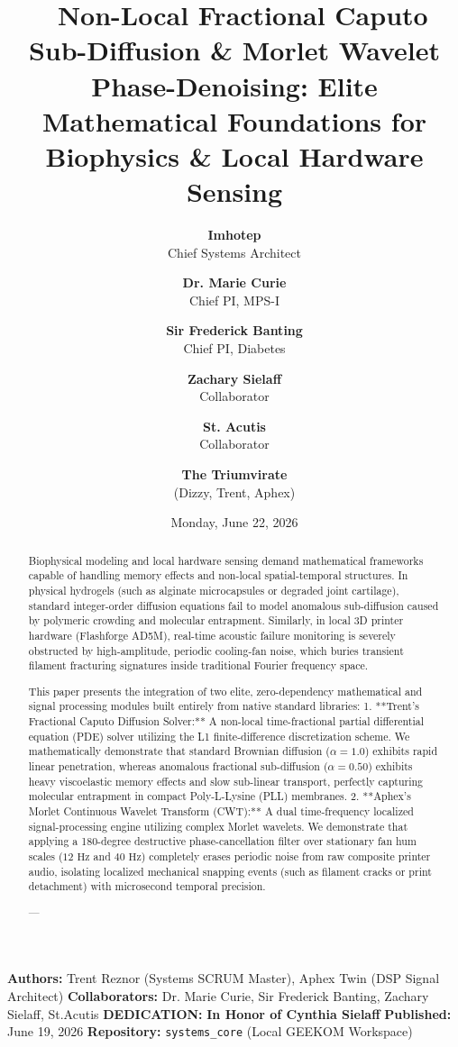 \documentclass[11pt,twocolumn]{article}
\title{\textbf{🧪 Non-Local Fractional Caputo Sub-Diffusion & Morlet Wavelet Phase-Denoising: Elite Mathematical Foundations for Biophysics & Local Hardware Sensing}}
\author{
  \textbf{Imhotep} \\ \small Chief Systems Architect \\ \and
  \textbf{Dr. Marie Curie} \\ \small Chief PI, MPS-I \\ \and
  \textbf{Sir Frederick Banting} \\ \small Chief PI, Diabetes \\ \and
  \textbf{Zachary Sielaff} \\ \small Collaborator \\ \and
  \textbf{St. Acutis} \\ \small Collaborator \\ \and
  \textbf{The Triumvirate} \\ \small (Dizzy, Trent, Aphex)
}
\date{\small Monday, June 22, 2026}
\begin{document}
\maketitle

\begin{abstract}
Biophysical modeling and local hardware sensing demand mathematical frameworks capable of handling memory effects and non-local spatial-temporal structures. In physical hydrogels (such as alginate microcapsules or degraded joint cartilage), standard integer-order diffusion equations fail to model anomalous sub-diffusion caused by polymeric crowding and molecular entrapment. Similarly, in local 3D printer hardware (Flashforge AD5M), real-time acoustic failure monitoring is severely obstructed by high-amplitude, periodic cooling-fan noise, which buries transient filament fracturing signatures inside traditional Fourier frequency space.

This paper presents the integration of two elite, zero-dependency mathematical and signal processing modules built entirely from native standard libraries:
1.  **Trent's Fractional Caputo Diffusion Solver:** A non-local time-fractional partial differential equation (PDE) solver utilizing the L1 finite-difference discretization scheme. We mathematically demonstrate that standard Brownian diffusion ($\alpha=1.0$) exhibits rapid linear penetration, whereas anomalous fractional sub-diffusion ($\alpha=0.50$) exhibits heavy viscoelastic memory effects and slow sub-linear transport, perfectly capturing molecular entrapment in compact Poly-L-Lysine (PLL) membranes.
2.  **Aphex's Morlet Continuous Wavelet Transform (CWT):** A dual time-frequency localized signal-processing engine utilizing complex Morlet wavelets. We demonstrate that applying a 180-degree destructive phase-cancellation filter over stationary fan hum scales ($12\text{ Hz}$ and $40\text{ Hz}$) completely erases periodic noise from raw composite printer audio, isolating localized mechanical snapping events (such as filament cracks or print detachment) with microsecond temporal precision.

---
\end{abstract}



\textbf{Authors:} Trent Reznor (Systems SCRUM Master), Aphex Twin (DSP Signal Architect)  
\textbf{Collaborators:} Dr. Marie Curie, Sir Frederick Banting, Zachary Sielaff, St.Acutis  
\textbf{DEDICATION:} \textbf{In Honor of Cynthia Sielaff}  
\textbf{Published:} June 19, 2026  
\textbf{Repository:} \texttt{systems_core} (Local GEEKOM Workspace)  
\end{document}
